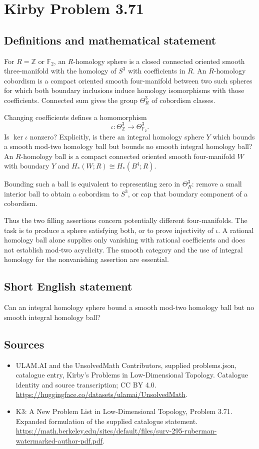 \documentclass[11pt,a4paper]{article}
\begin{document}
\section*{Kirby Problem 3.71}\label{statement}

\subsection{Definitions and mathematical statement}
For $R=\mathbb Z$ or $\mathbb F_2$, an $R$-homology sphere is a closed connected oriented smooth three-manifold with the homology of $S^3$ with coefficients in $R$. An $R$-homology cobordism is a compact oriented smooth four-manifold between two such spheres for which both boundary inclusions induce homology isomorphisms with those coefficients. Connected sum gives the group $\Theta^3_R$ of cobordism classes.

Changing coefficients defines a homomorphism
\[
\iota:\Theta^3_{\mathbb Z}\longrightarrow\Theta^3_{\mathbb F_2}.
\]
Is $\ker\iota$ nonzero? Explicitly, is there an integral homology sphere $Y$ which bounds a smooth mod-two homology ball but bounds no smooth integral homology ball? An $R$-homology ball is a compact connected oriented smooth four-manifold $W$ with boundary $Y$ and $H_*(W;R)\cong H_*(B^4;R)$.

Bounding such a ball is equivalent to representing zero in $\Theta^3_R$: remove a small interior ball to obtain a cobordism to $S^3$, or cap that boundary component of a cobordism.

Thus the two filling assertions concern potentially different four-manifolds. The task is to produce a sphere satisfying both, or to prove injectivity of $\iota$. A rational homology ball alone supplies only vanishing with rational coefficients and does not establish mod-two acyclicity. The smooth category and the use of integral homology for the nonvanishing assertion are essential.
\subsection{Short English statement}
Can an integral homology sphere bound a smooth mod-two homology ball but no smooth integral homology ball?
\subsection{Sources}
\begin{itemize}
\item[S1] ULAM.AI and the UnsolvedMath Contributors, supplied problems.json, catalogue entry, Kirby's Problems in Low-Dimensional Topology. Catalogue identity and source transcription; CC BY 4.0.
\url{https://huggingface.co/datasets/ulamai/UnsolvedMath}.
\item[S2] K3: A New Problem List in Low-Dimensional Topology, Problem 3.71. Expanded formulation of the supplied catalogue statement.
\url{https://math.berkeley.edu/sites/default/files/surv-295-ruberman-watermarked-author-pdf.pdf}.
\end{itemize}
\end{document}
